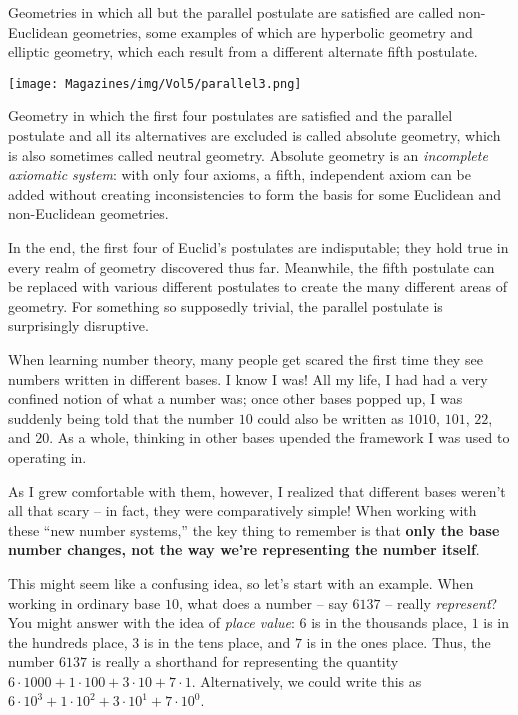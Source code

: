 \documentclass{article}
\begin{document}
\begin{multicols}{3}
Geometries in which all but the parallel postulate are satisfied are called non-Euclidean geometries, some examples of which are hyperbolic geometry and elliptic geometry, which each result from a different alternate fifth postulate. 

\begin{center}
    \texttt{[image: Magazines/img/Vol5/parallel3.png]}
\end{center}

Geometry in which the first four postulates are satisfied and the parallel postulate and all its alternatives are excluded is called absolute geometry, which is also sometimes called neutral geometry. Absolute geometry is an \textit{incomplete axiomatic system}: with only four axioms, a fifth, independent axiom can be added without creating inconsistencies to form the basis for some Euclidean and non-Euclidean geometries. 

In the end, the first four of Euclid’s postulates are indisputable; they hold true in every realm of geometry discovered thus far. Meanwhile, the fifth postulate can be replaced with various different postulates to create the many different areas of geometry. For something so supposedly trivial, the parallel postulate is surprisingly disruptive.
\closearticle

When learning number theory, many people get scared the first time they see numbers written in different bases. I know I was! All my life, I had had a very confined notion of what a number was; once other bases popped up, I was suddenly being told that the number $10$ could also be written as $1010$, $101$, $22$, and $20$. As a whole, thinking in other bases upended the framework I was used to operating in.

As I grew comfortable with them, however, I realized that different bases weren’t all that scary -- in fact, they were comparatively simple! When working with these “new number systems,” the key thing to remember is that \textbf{only the base number changes, not the way we’re representing the number itself}. 

This might seem like a confusing idea, so let’s start with an example. When working in ordinary base $10$, what does a number -- say $6137$ -- really \textit{represent}? You might answer with the idea of \textit{place value}: $6$ is in the thousands place, $1$ is in the hundreds place, $3$ is in the tens place, and $7$ is in the ones place.
Thus, the number $6137$ is really a shorthand for representing the quantity $6\cdot 1000 + 1\cdot 100 + 3\cdot 10+7\cdot 1$. Alternatively, we could write this as $6\cdot 10^3+1\cdot 10^2+3\cdot 10^1+7\cdot 10^0$. 


\end{multicols}
\end{document}
